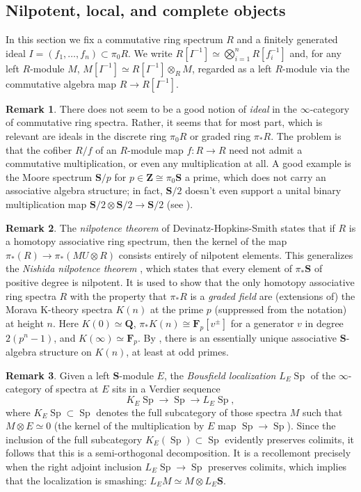 \documentclass{article}
\theoremstyle{definition}
\newtheorem{remark}{Remark}[subsection]
\newcommand{\FF}{\mathbf{F}}
\newcommand{\QQ}{\mathbf{Q}}
\renewcommand{\SS}{\mathbf{S}}
\newcommand{\ZZ}{\mathbf{Z}}
\renewcommand{\i}{\infty}
\newcommand{\too}{\longrightarrow}
\DeclareMathOperator{\Sp}{Sp}
\begin{document}
\subsection{Nilpotent, local, and complete objects}
In this section we fix a commutative ring spectrum $R$ and a finitely generated ideal $I=(f_1,\ldots,f_n)\subset\pi_0 R$.
We write $R[I^{-1}]\simeq\bigotimes_{i=1}^n R[f_i^{-1}]$ and, for any left $R$-module $M$, $M[I^{-1}]\simeq  R[I^{-1}]\otimes_R M$, regarded as a left $R$-module via the commutative algebra map $R\to R[I^{-1}]$.
\begin{remark}
There does not seem to be a good notion of {\em ideal} in the $\i$-category of commutative ring spectra.
Rather, it seems that for most part, which is relevant are ideals in the discrete ring $\pi_0 R$ or graded ring $\pi_* R$.
The problem is that the cofiber $R/f$ of an $R$-module map $f:R\to R$ need not admit a commutative multiplication, or even any multiplication at all.
A good example is the Moore spectrum $\SS/p$ for $p\in\ZZ\cong\pi_0\SS$ a prime, which does not carry an associative algebra structure; in fact, $\SS/2$ doesn't even support a unital binary multiplication map $\SS/2\otimes\SS/2\to\SS/2$ (see \cite[Proposition 4]{Sc10}).
\end{remark}

\begin{remark}
The {\em nilpotence theorem} of Devinatz-Hopkins-Smith \cite{DHS} states that if $R$ is a homotopy associative ring spectrum, then the kernel of the map $\pi_*(R)\to\pi_*(MU\otimes R)$ consists entirely of nilpotent elements.
This generalizes the {\em Nishida nilpotence theorem} \cite{Ni73}, which states that every element of $\pi_*\SS$ of positive degree is nilpotent.
It is used to show that  the only homotopy associative ring spectra $R$ with the property that $\pi_* R$ is a {\em graded field} are (extensions of) the Morava K-theory spectra $K(n)$ at the prime $p$ (suppressed from the notation) at height $n$.
Here $K(0)\simeq\QQ$,  $\pi_* K(n)\cong\FF_p[v^{\pm}]$ for a generator $v$ in degree $2(p^n-1)$, and $K(\infty)\simeq\FF_p$.
By \cite{An11}, there is an essentially unique associative $\SS$-algebra structure on $K(n)$, at least at odd primes.
\end{remark}

\begin{remark}
Given a left $\SS$-module $E$, the {\em Bousfield localization} $L_E\Sp$ of the $\i$-category of spectra at $E$ sits in a Verdier sequence
\[
K_E\Sp\too\Sp\too L_E\Sp,
\]
where $K_E\Sp\subset\Sp$ denotes the full subcategory of those spectra $M$ such that $M\otimes E\simeq 0$ (the kernel of the multiplication by $E$ map $\Sp\to\Sp$).
Since the inclusion of the full subcategory $K_E(\Sp)\subset\Sp$ evidently preserves colimits, it follows that this is a semi-orthogonal decomposition.
It is a recollemont precisely when the right adjoint inclusion $L_E\Sp\to\Sp$ preserves colimits, which implies that the localization is smashing: $L_E M\simeq M\otimes L_E\SS$.
\end{remark}
\end{document}
